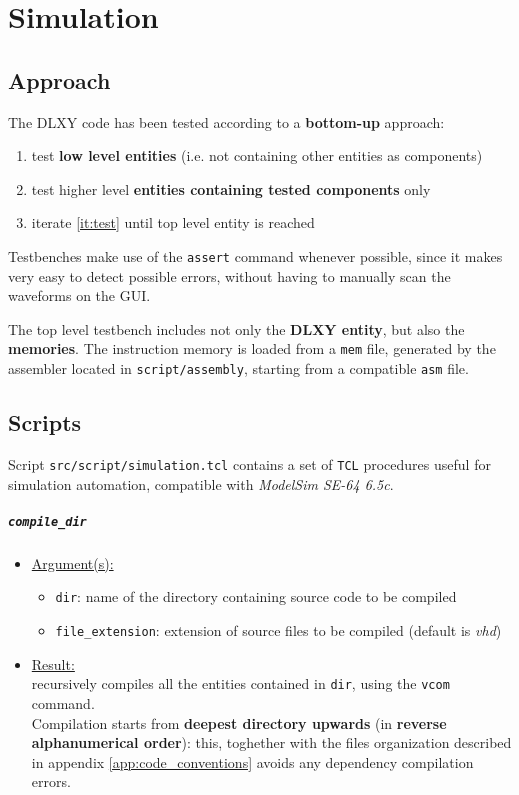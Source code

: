 \chapter{Simulation}
\label{chap:simulation}

\section{Approach}
The DLXY code has been tested according to a \textbf{bottom-up} approach:
\begin{enumerate}
	\item test \textbf{low level entities} (i.e. not containing other
		entities as components)
	\item \label{it:test} test higher level \textbf{entities containing
		tested components} only
	\item iterate \ref{it:test} until top level entity is reached
\end{enumerate}

Testbenches make use of the \texttt{assert} command whenever possible, since
it makes very easy to detect possible errors, without having to manually scan
the waveforms on the GUI.

\bigskip
The top level testbench includes not only the \textbf{DLXY entity}, but also the
\textbf{memories}. The instruction memory is loaded from a \texttt{mem} file,
generated by the assembler located in \texttt{script/assembly}, starting from
a compatible \texttt{asm} file.

\section{Scripts}
Script \texttt{src/script/simulation.tcl} contains a set of \texttt{TCL}
procedures useful for simulation automation, compatible with
\textit{ModelSim SE-64 6.5c}.

\paragraph{\texttt{compile\_dir}}
\begin{itemize}
	\item \underline{Argument(s):}
		\begin{itemize}
			\item \texttt{dir}: name of the directory containing
				source code to be compiled
			\item \texttt{file\_extension}: extension of source files
				to be compiled (default is \textit{vhd})
		\end{itemize}
	\item \underline{Result:} \\
		recursively compiles all the entities contained in \texttt{dir},
		using the \texttt{vcom} command. \\
		Compilation starts from \textbf{deepest directory upwards} (in
		\textbf{reverse alphanumerical order}): this, toghether with the
		files organization described in appendix
		\ref{app:code_conventions} avoids any dependency compilation errors.
\end{itemize}

